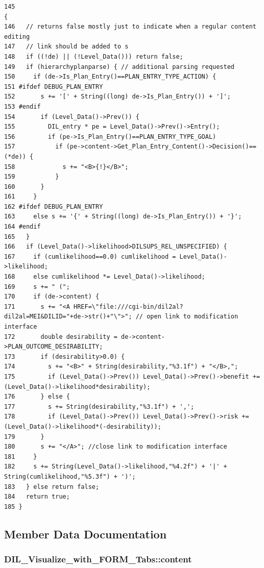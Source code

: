\footnotesize\begin{verbatim}145                                                                       {
146   // returns false mostly just to indicate when a regular content editing
147   // link should be added to s
148   if ((!de) || (!Level_Data())) return false;
149   if (hierarchyplanparse) { // additional parsing requested
150     if (de->Is_Plan_Entry()==PLAN_ENTRY_TYPE_ACTION) {
151 #ifdef DEBUG_PLAN_ENTRY
152       s += '[' + String((long) de->Is_Plan_Entry()) + ']';
153 #endif
154       if (Level_Data()->Prev()) {
155         DIL_entry * pe = Level_Data()->Prev()->Entry();
156         if (pe->Is_Plan_Entry()==PLAN_ENTRY_TYPE_GOAL)
157           if (pe->content->Get_Plan_Entry_Content()->Decision()==(*de)) {
158             s += "<B>{!}</B>";
159           }
160       }
161     }
162 #ifdef DEBUG_PLAN_ENTRY
163     else s += '{' + String((long) de->Is_Plan_Entry()) + '}';
164 #endif
165   }
166   if (Level_Data()->likelihood>DILSUPS_REL_UNSPECIFIED) {
167     if (cumlikelihood==0.0) cumlikelihood = Level_Data()->likelihood;
168     else cumlikelihood *= Level_Data()->likelihood;
169     s += " (";
170     if (de->content) {
171       s += "<A HREF=\"file:///cgi-bin/dil2al?dil2al=MEI&DILID="+de->str()+"\">"; // open link to modification interface
172       double desirability = de->content->PLAN_OUTCOME_DESIRABILITY;
173       if (desirability>0.0) {
174         s += "<B>" + String(desirability,"%3.1f") + "</B>,";
175         if (Level_Data()->Prev()) Level_Data()->Prev()->benefit += (Level_Data()->likelihood*desirability);
176       } else {
177         s += String(desirability,"%3.1f") + ',';
178         if (Level_Data()->Prev()) Level_Data()->Prev()->risk += (Level_Data()->likelihood*(-desirability));
179       }
180       s += "</A>"; //close link to modification interface
181     } 
182     s += String(Level_Data()->likelihood,"%4.2f") + '|' + String(cumlikelihood,"%5.3f") + ')';
183   } else return false;
184   return true;
185 }
\end{verbatim}\normalsize 


\subsection{Member Data Documentation}
\subsubsection{ DIL\_\-Visualize\_\-with\_\-FORM\_\-Tabs::content\hspace{0.3cm}{\tt  [protected]}}\label{classDIL__Visualize__with__FORM__Tabs_n1}




